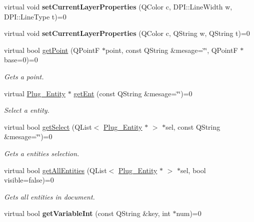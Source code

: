 \begin{DoxyCompactItemize}
\item 
\hypertarget{classDocument__Interface_a10d8d1540388cc2c5d242228e531b4e6}{virtual void {\bfseries set\-Current\-Layer\-Properties} (Q\-Color c, D\-P\-I\-::\-Line\-Width w, D\-P\-I\-::\-Line\-Type t)=0}\label{classDocument__Interface_a10d8d1540388cc2c5d242228e531b4e6}

\item 
\hypertarget{classDocument__Interface_a8a1ecda4cd61f9489a2ae85a1776cd14}{virtual void {\bfseries set\-Current\-Layer\-Properties} (Q\-Color c, Q\-String w, Q\-String t)=0}\label{classDocument__Interface_a8a1ecda4cd61f9489a2ae85a1776cd14}

\item 
virtual bool \hyperlink{classDocument__Interface_accafc3c2812bbe033a6b8d073ad4e08e}{get\-Point} (Q\-Point\-F $\ast$point, const Q\-String \&mesage=\char`\"{}\char`\"{}, Q\-Point\-F $\ast$base=0)=0
\begin{DoxyCompactList}\small\item\em Gets a point. \end{DoxyCompactList}\item 
virtual \hyperlink{classPlug__Entity}{Plug\-\_\-\-Entity} $\ast$ \hyperlink{classDocument__Interface_a7308de4c648f7d50f16b80409a96e219}{get\-Ent} (const Q\-String \&mesage=\char`\"{}\char`\"{})=0
\begin{DoxyCompactList}\small\item\em Select a entity. \end{DoxyCompactList}\item 
virtual bool \hyperlink{classDocument__Interface_a594499acd4061007467a9b1a266567ed}{get\-Select} (Q\-List$<$ \hyperlink{classPlug__Entity}{Plug\-\_\-\-Entity} $\ast$ $>$ $\ast$sel, const Q\-String \&mesage=\char`\"{}\char`\"{})=0
\begin{DoxyCompactList}\small\item\em Gets a entities selection. \end{DoxyCompactList}\item 
virtual bool \hyperlink{classDocument__Interface_a5c4f3065fa558ccfe8236b7192e3ac02}{get\-All\-Entities} (Q\-List$<$ \hyperlink{classPlug__Entity}{Plug\-\_\-\-Entity} $\ast$ $>$ $\ast$sel, bool visible=false)=0
\begin{DoxyCompactList}\small\item\em Gets all entities in document. \end{DoxyCompactList}\item 
\hypertarget{classDocument__Interface_aa2547d15b66f871b2fa051f461d9a303}{virtual bool {\bfseries get\-Variable\-Int} (const Q\-String \&key, int $\ast$num)=0}\label{classDocument__Interface_aa2547d15b66f871b2fa051f461d9a303}


\end{DoxyCompactItemize}
